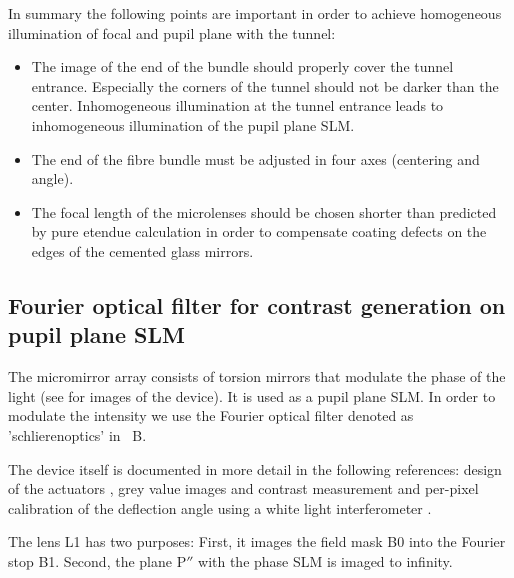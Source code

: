 In summary the following points are important in order to achieve
homogeneous illumination of focal and pupil plane with the tunnel:
\begin{itemize}
\item The image of the end of the bundle should properly cover the
  tunnel entrance. Especially the corners of the tunnel should not be
  darker than the center. Inhomogeneous illumination at the tunnel
  entrance leads to inhomogeneous illumination of the pupil plane SLM.
\item The end of the fibre bundle must be adjusted in four axes
  (centering and angle).
\item The focal length of the microlenses should be chosen shorter
  than predicted by pure etendue calculation in order to compensate
  coating defects on the edges of the cemented glass mirrors.
\end{itemize}

\subsection{Fourier optical filter for contrast generation on pupil
  plane SLM}
\label{sec:mma}
The micromirror array consists of
torsion mirrors that modulate the phase of the light (see
 for images of the device). It is used as a pupil plane SLM.
In order to modulate the
intensity we use the Fourier optical filter denoted as
'schlierenoptics' in ~B.

The device itself is documented in more detail in the following
references: design of the actuators \citep{Schmidt2010}, grey value
images and contrast measurement \citep{Berndt2010} and per-pixel
calibration of the deflection angle using a white light interferometer
\citep{Berndt2011,Berndt2007}.


The lens L1 has two purposes: First, it images the field mask B0 into 
the Fourier stop B1. Second, the plane $\textrm{P}''$ with the phase
SLM is imaged to infinity.

